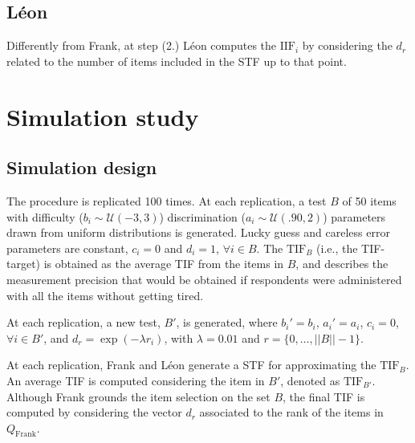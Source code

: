 \documentclass{svproc}
\begin{document}
\color{blue}
\subsection{Léon}
Differently from Frank, at step (2.) Léon computes the $\text{IIF}_i$ by considering the $d_r$ related to the number of items included in the STF up to that point.  
\normalcolor


\section{Simulation study}

\subsection{Simulation design}



The procedure is replicated 100 times. At each replication, a test $B$ of 50 items with difficulty ($b_i \sim \mathcal{U}(-3, 3)$) discrimination ($a_i \sim \mathcal{U}(.90, 2)$) parameters drawn from uniform distributions is generated. Lucky 
guess and careless error parameters are constant, $c_i = 0$ and $d_i = 1$, $\forall i \in B$.
The $\text{TIF}_B$ (i.e., the TIF-target) is obtained as the average TIF  from the items in $B$, and describes the measurement precision that would be obtained if respondents were administered with all the items without getting tired. 

\color{blue}
At each replication, a new test, $B'$, is generated, where $b_i' = b_i$, $a_i' = a_i$, $c_i = 0$, $\forall i \in B'$, and $d_r = \exp(-\lambda r_i)$, with $\lambda = 0.01$ and $r = \{0, \ldots, ||B|| -1\}$.

At each replication, Frank and Léon generate a STF for approximating the $\text{TIF}_B$. An average TIF is computed considering the item in $B'$, denoted as $\text{TIF}_{B'}$.
Although Frank grounds the item selection on the set $B$, the final TIF is computed by considering the vector $d_r$ associated to the rank of the items in $Q_{\text{Frank}}$.
\normalcolor
\end{document}
